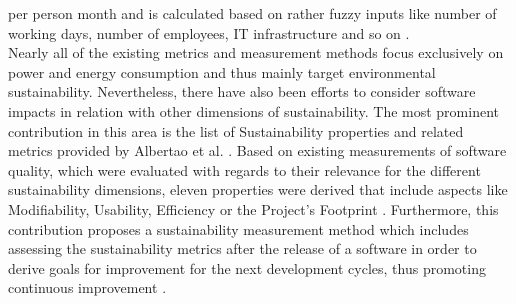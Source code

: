 \documentclass[oribibl]{llncs}
\begin{document}
per person month and is calculated based on rather fuzzy inputs like number of working days, number of employees, IT infrastructure and so on \cite{kern_impacts_2015}.\\
Nearly all of the existing metrics and measurement methods focus exclusively on power and energy consumption and thus mainly target environmental sustainability. %
Nevertheless, there have also been efforts to consider software impacts in relation with other dimensions of sustainability. The most prominent contribution in this area is the list of Sustainability properties and related metrics provided by Albertao et al. \cite{albertao_measuring_2010}. Based on existing measurements of software quality, which were evaluated with regards to their relevance for the different sustainability dimensions, eleven properties were derived that include aspects like Modifiability, Usability, Efficiency or the Project's Footprint \cite{albertao_measuring_2010}. Furthermore, this contribution proposes a sustainability measurement method which includes assessing the sustainability metrics after the release of a software in order to derive goals for improvement for the next development cycles, thus promoting continuous improvement \cite{albertao_measuring_2010}.

\end{document}

